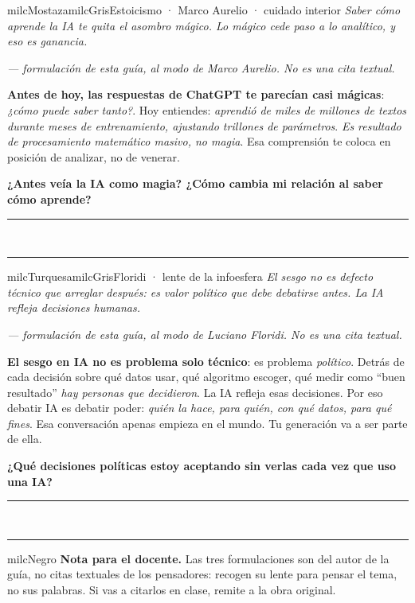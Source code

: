 \documentclass[11pt,letterpaper]{article}
\newcommand{\linead}[1]{\noindent\color{milcLinea}\rule{#1}{0.5pt}\color{milcNegro}}
\begin{document}
\begin{softbox}{milcMostaza}{milcGris}{Estoicismo · Marco Aurelio · cuidado interior}
\textit{Saber cómo aprende la IA te quita el asombro mágico. Lo mágico cede paso a lo analítico, y eso es ganancia.}

{\footnotesize\itshape\color{milcNegro!70}--- formulación de esta guía, al modo de Marco Aurelio. No es una cita textual.}

\textbf{Antes de hoy, las respuestas de ChatGPT te parecían casi mágicas}: \emph{¿cómo puede saber tanto?}. Hoy entiendes: \emph{aprendió de miles de millones de textos durante meses de entrenamiento, ajustando trillones de parámetros}. \emph{Es resultado de procesamiento matemático masivo, no magia}. Esa comprensión te coloca en posición de analizar, no de venerar.

\textbf{¿Antes veía la IA como magia? ¿Cómo cambia mi relación al saber cómo aprende?}
\end{softbox}
\linead{\linewidth}\\[1mm]
\linead{\linewidth}

\begin{softbox}{milcTurquesa}{milcGris}{Floridi · lente de la infoesfera}
\textit{El sesgo no es defecto técnico que arreglar después: es valor político que debe debatirse antes. La IA refleja decisiones humanas.}

{\footnotesize\itshape\color{milcNegro!70}--- formulación de esta guía, al modo de Luciano Floridi. No es una cita textual.}

\textbf{El sesgo en IA no es problema solo técnico}: es problema \emph{político}. Detrás de cada decisión sobre qué datos usar, qué algoritmo escoger, qué medir como ``buen resultado'' \emph{hay personas que decidieron}. La IA refleja esas decisiones. Por eso debatir IA es debatir poder: \emph{quién la hace, para quién, con qué datos, para qué fines}. Esa conversación apenas empieza en el mundo. Tu generación va a ser parte de ella.

\textbf{¿Qué decisiones políticas estoy aceptando sin verlas cada vez que uso una IA?}
\end{softbox}
\linead{\linewidth}\\[1mm]
\linead{\linewidth}

\begin{infoband}{milcNegro}
\textbf{Nota para el docente.} Las tres formulaciones son del autor de la guía, no citas textuales de los pensadores: recogen su lente para pensar el tema, no sus palabras. Si vas a citarlos en clase, remite a la obra original.
\end{infoband}
\end{document}
